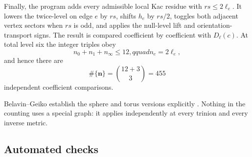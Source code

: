 \documentclass[11pt]{article}
\begin{document}
Finally, the program adds every admissible local Kac residue with
\(rs\le2\ell_e\).  It lowers the twice-level on edge \(e\) by \(rs\), shifts
\(h_e\) by \(rs/2\), toggles both adjacent vertex sectors when \(rs\) is odd,
and applies the null-level lift and orientation-transport signs.  The result
is compared coefficient by coefficient with \(D_{\bm\ell}(c)\).  At total
level six the integer triples obey
\begin{equation}
 n_0+n_1+n_\infty\le12,qquad n_e=2\ell_e,
\end{equation}
and hence there are
\begin{equation}
 \#\{\bm n\}=\binom{12+3}{3}=455
 \label{eq:level-six-coefficient-count}
\end{equation}
independent coefficient comparisons.

Belavin--Geiko establish the sphere and torus versions explicitly
\cite{BelavinGeiko2018CRecursion}.  Nothing in the counting uses a special
graph: it applies independently at every trinion and every inverse metric.


\subsection{Automated checks}
\label{sec:python-checks}
\end{document}
